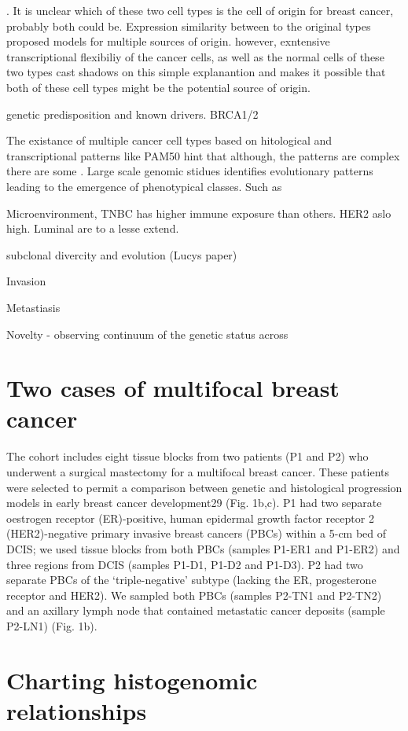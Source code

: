 . It is unclear which of these two cell types is the cell of origin for breast cancer, probably both could be. Expression similarity between to the original types proposed models for multiple sources of origin. however, exntensive transcriptional flexibiliy of the cancer cells, as well as the normal cells of these two types cast shadows on this simple explanantion and makes it possible that both of these cell types might be the potential source of origin.

genetic predisposition and known drivers. BRCA1/2

The existance of multiple cancer cell types based on hitological and transcriptional patterns like PAM50 hint that although, the patterns are complex there are some . Large scale genomic stidues identifies evolutionary patterns leading to the emergence of phenotypical classes. Such as

Microenvironment, \ac{TNBC} has higher immune exposure than others. HER2 aslo high. Luminal are to a lesse extend. 

subclonal divercity and evolution (Lucys paper)

Invasion

Metastiasis

Novelty - observing continuum of the genetic status across 
\section{Two cases of multifocal breast cancer}

The cohort includes eight tissue blocks from two patients (P1 and P2) who underwent a surgical mastectomy for a multifocal breast cancer. These patients were selected to permit a comparison between genetic and histological progression models in early breast cancer development29 (Fig. 1b,c). P1 had two separate oestrogen receptor (ER)-positive, human epidermal growth factor receptor 2 (HER2)-negative primary invasive breast cancers (PBCs) within a 5-cm bed of DCIS; we used tissue blocks from both PBCs (samples P1-ER1 and P1-ER2) and three regions from DCIS (samples P1-D1, P1-D2 and P1-D3). P2 had two separate PBCs of the ‘triple-negative’ subtype (lacking the ER, progesterone receptor and HER2). We sampled both PBCs (samples P2-TN1 and P2-TN2) and an axillary lymph node that contained metastatic cancer deposits (sample P2-LN1) (Fig. 1b).

\section{Charting histogenomic relationships}

